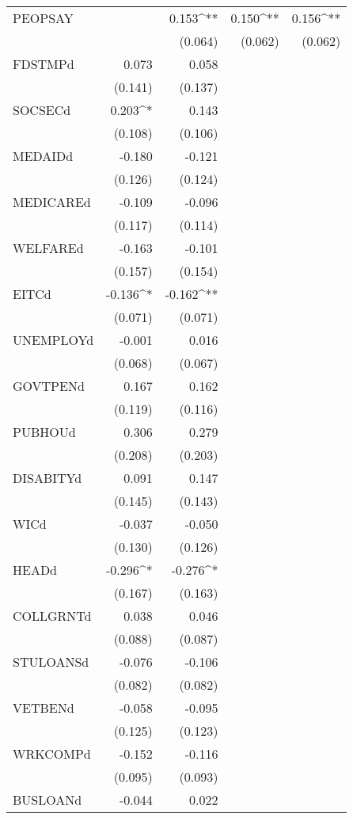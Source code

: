 \begin{table}[!htbp]
\begin{tabular}{@{\extracolsep{5pt}}lD{.}{.}{-3} D{.}{.}{-3} D{.}{.}{-3} D{.}{.}{-3} }
  PEOPSAY &  & 0.153^{**} & 0.150^{**} & 0.156^{**} \\ 
  &  & (0.064) & (0.062) & (0.062) \\ 
  FDSTMPd & 0.073 & 0.058 &  &  \\ 
  & (0.141) & (0.137) &  &  \\ 
  SOCSECd & 0.203^{*} & 0.143 &  &  \\ 
  & (0.108) & (0.106) &  &  \\ 
  MEDAIDd & -0.180 & -0.121 &  &  \\ 
  & (0.126) & (0.124) &  &  \\ 
  MEDICAREd & -0.109 & -0.096 &  &  \\ 
  & (0.117) & (0.114) &  &  \\ 
  WELFAREd & -0.163 & -0.101 &  &  \\ 
  & (0.157) & (0.154) &  &  \\ 
  EITCd & -0.136^{*} & -0.162^{**} &  &  \\ 
  & (0.071) & (0.071) &  &  \\ 
  UNEMPLOYd & -0.001 & 0.016 &  &  \\ 
  & (0.068) & (0.067) &  &  \\ 
  GOVTPENd & 0.167 & 0.162 &  &  \\ 
  & (0.119) & (0.116) &  &  \\ 
  PUBHOUd & 0.306 & 0.279 &  &  \\ 
  & (0.208) & (0.203) &  &  \\ 
  DISABITYd & 0.091 & 0.147 &  &  \\ 
  & (0.145) & (0.143) &  &  \\ 
  WICd & -0.037 & -0.050 &  &  \\ 
  & (0.130) & (0.126) &  &  \\ 
  HEADd & -0.296^{*} & -0.276^{*} &  &  \\ 
  & (0.167) & (0.163) &  &  \\ 
  COLLGRNTd & 0.038 & 0.046 &  &  \\ 
  & (0.088) & (0.087) &  &  \\ 
  STULOANSd & -0.076 & -0.106 &  &  \\ 
  & (0.082) & (0.082) &  &  \\ 
  VETBENd & -0.058 & -0.095 &  &  \\ 
  & (0.125) & (0.123) &  &  \\ 
  WRKCOMPd & -0.152 & -0.116 &  &  \\ 
  & (0.095) & (0.093) &  &  \\ 
  BUSLOANd & -0.044 & 0.022 &  &  \\ 

\end{tabular}
\end{table}
